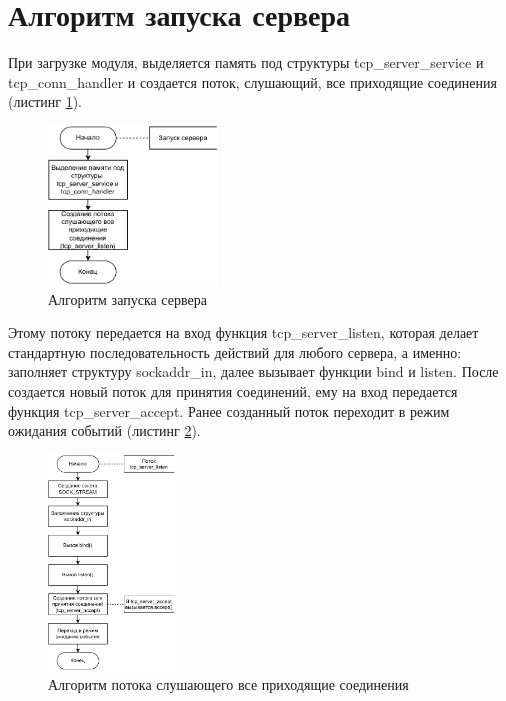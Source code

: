 \newpage 
\section{Алгоритм запуска сервера}
При загрузке модуля, выделяется память под структуры tcp\_server\_service и tcp\_conn\_handler и создается поток, слушающий, все приходящие соединения (листинг \ref{network_server_init}). 

\begin{figure}[h]
	\centering
	\includegraphics[width=0.4\textwidth]{inc/network_server_init.drawio.pdf}
	\caption{Алгоритм запуска сервера}
	\label{network_server_init}
\end{figure}

Этому потоку передается на вход функция tcp\_server\_listen, которая делает стандартную последовательность действий для любого сервера, а именно: заполняет структуру sockaddr\_in, далее вызывает функции bind и listen. После создается новый поток для принятия соединений, ему на вход передается функция tcp\_server\_accept. Ранее созданный поток переходит в режим ожидания событий (листинг \ref{tcp_server_listen}). 

\begin{figure}[h]
	\centering
	\includegraphics[width=0.3\textwidth]{inc/tcp_server_listen.drawio.pdf}
	\caption{Алгоритм потока слушающего все приходящие соединения}
	\label{tcp_server_listen}
\end{figure}

